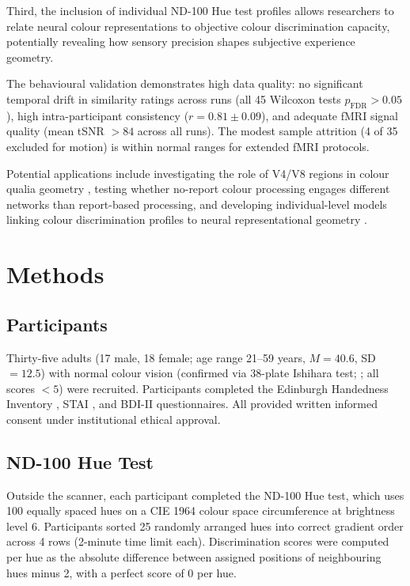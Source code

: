 \documentclass[11pt]{article}
\begin{document}
Third, the inclusion of individual ND-100 Hue test profiles allows researchers to relate neural colour representations to objective colour discrimination capacity, potentially revealing how sensory precision shapes subjective experience geometry.

The behavioural validation demonstrates high data quality: no significant temporal drift in similarity ratings across runs (all 45 Wilcoxon tests $p_{\mathrm{FDR}} > 0.05$), high intra-participant consistency ($r = 0.81 \pm 0.09$), and adequate fMRI signal quality (mean tSNR $> 84$ across all runs). The modest sample attrition (4 of 35 excluded for motion) is within normal ranges for extended fMRI protocols.

Potential applications include investigating the role of V4/V8 regions in colour qualia geometry \citep{bartels2000architecture, hadjikhani1998retinotopy}, testing whether no-report colour processing engages different networks than report-based processing, and developing individual-level models linking colour discrimination profiles to neural representational geometry \citep{brouwer2009decoding, naselaris2011encoding}.

\section{Methods}

\subsection{Participants}
Thirty-five adults (17 male, 18 female; age range 21--59 years, $M = 40.6$, SD $= 12.5$) with normal colour vision (confirmed via 38-plate Ishihara test; \citealt{ishihara1972tests}; all scores $< 5$) were recruited. Participants completed the Edinburgh Handedness Inventory \citep{oldfield1971assessment}, STAI \citep{spielberger1983state}, and BDI-II \citep{beck1961inventory} questionnaires. All provided written informed consent under institutional ethical approval.

\subsection{ND-100 Hue Test}
Outside the scanner, each participant completed the ND-100 Hue test, which uses 100 equally spaced hues on a CIE 1964 colour space circumference at brightness level 6. Participants sorted 25 randomly arranged hues into correct gradient order across 4 rows (2-minute time limit each). Discrimination scores were computed per hue as the absolute difference between assigned positions of neighbouring hues minus 2, with a perfect score of 0 per hue.
\end{document}
